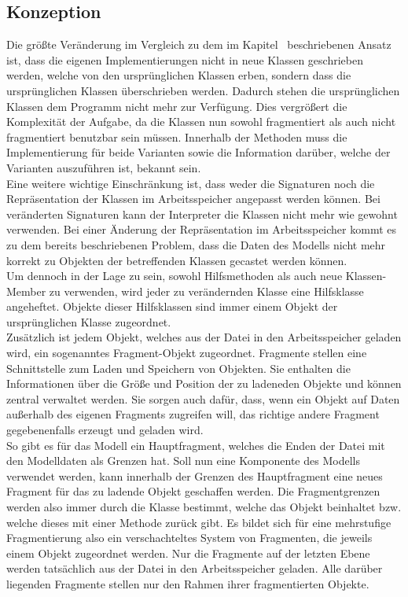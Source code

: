 \subsection{Konzeption}
    Die größte Veränderung im Vergleich zu dem im Kapitel~ beschriebenen Ansatz ist, dass die eigenen Implementierungen nicht in neue Klassen geschrieben werden, welche von den ursprünglichen Klassen erben, sondern dass die ursprünglichen Klassen überschrieben werden. Dadurch stehen die ursprünglichen Klassen dem Programm nicht mehr zur Verfügung. Dies vergrößert die Komplexität der Aufgabe, da die Klassen nun sowohl fragmentiert als auch nicht fragmentiert benutzbar sein müssen. Innerhalb der Methoden muss die Implementierung für beide Varianten sowie die Information darüber, welche der Varianten auszuführen ist, bekannt sein.\\ Eine weitere wichtige Einschränkung ist, dass weder die Signaturen noch die Repräsentation der Klassen im Arbeitsspeicher angepasst werden können. Bei veränderten Signaturen kann der Interpreter die Klassen nicht mehr wie gewohnt verwenden. Bei einer Änderung der Repräsentation im Arbeitsspeicher kommt es zu dem bereits beschriebenen Problem, dass die Daten des Modells nicht mehr korrekt zu Objekten der betreffenden Klassen gecastet werden können.\\ Um dennoch in der Lage zu sein, sowohl Hilfsmethoden als auch neue Klassen-Member zu verwenden, wird jeder zu verändernden Klasse eine Hilfsklasse angeheftet. Objekte dieser Hilfsklassen sind immer einem Objekt der ursprünglichen Klasse zugeordnet.\\ Zusätzlich ist jedem Objekt, welches aus der Datei in den Arbeitsspeicher geladen wird, ein sogenanntes Fragment-Objekt zugeordnet. Fragmente stellen eine Schnittstelle zum Laden und Speichern von Objekten. Sie enthalten die Informationen über die Größe und Position der zu ladeneden Objekte und können zentral verwaltet werden. Sie sorgen auch dafür, dass, wenn ein Objekt auf Daten außerhalb des eigenen Fragments zugreifen will, das richtige andere Fragment gegebenenfalls erzeugt und geladen wird.\\ So gibt es für das Modell ein Hauptfragment, welches die Enden der Datei mit den Modelldaten als Grenzen hat. Soll nun eine Komponente des Modells verwendet werden, kann innerhalb der Grenzen des Hauptfragment eine neues Fragment für das zu ladende Objekt geschaffen werden. Die Fragmentgrenzen werden also immer durch die Klasse bestimmt, welche das Objekt beinhaltet bzw. welche dieses mit einer Methode zurück gibt. Es bildet sich für eine mehrstufige Fragmentierung also ein verschachteltes System von Fragmenten, die jeweils einem Objekt zugeordnet werden. Nur die Fragmente auf der letzten Ebene werden tatsächlich aus der Datei in den Arbeitsspeicher geladen. Alle darüber liegenden Fragmente stellen nur den Rahmen ihrer fragmentierten Objekte.

